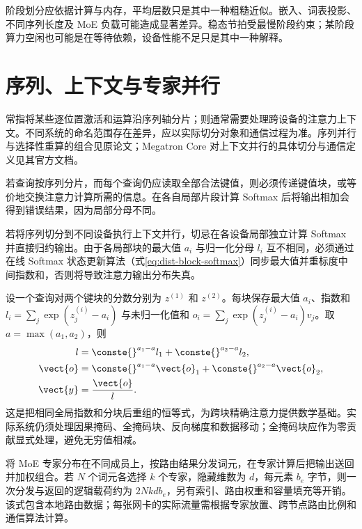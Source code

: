 \documentclass[../textbook.tex]{subfiles}
\begin{document}
阶段划分应依据计算与内存，平均层数只是其中一种粗糙近似。嵌入、词表投影、不同序列长度及 MoE 负载可能造成显著差异。稳态节拍受最慢阶段约束；某阶段算力空闲也可能是在等待依赖，设备性能不足只是其中一种解释。

\section{序列、上下文与专家并行}
\optional
{}常指将某些逐位置激活和运算沿序列轴分片；则通常需要处理跨设备的注意力上下文。不同系统的命名范围存在差异，应以实际切分对象和通信过程为准。序列并行与选择性重算的组合见原论文\autocite{korthikanti2022recomputation}；Megatron Core 对上下文并行的具体切分与通信定义见其官方文档\autocite{nvidia2026contextparallel}。

若查询按序列分片，而每个查询仍应读取全部合法键值，则必须传递键值块，或等价地交换注意力计算所需的信息。在各自局部片段计算 Softmax 后将输出相加会得到错误结果，因为局部分母不同。

\begin{warning}
若将序列切分到不同设备执行上下文并行，切忌在各设备局部独立计算 Softmax 并直接归约输出。由于各局部块的最大值 $a_i$ 与归一化分母 $l_i$ 互不相同，必须通过在线 Softmax 状态更新算法（式\eqref{eq:dist-block-softmax}）同步最大值并重标度中间指数和，否则将导致注意力输出分布失真。
\end{warning}

设一个查询对两个键块的分数分别为 $z^{(1)}$ 和 $z^{(2)}$。每块保存最大值 $a_i$、指数和 $l_i=\sum_j\exp(z_j^{(i)}-a_i)$ 与未归一化值和 $o_i=\sum_j\exp(z_j^{(i)}-a_i)v_j$。取 $a=\max(a_1,a_2)$，则
\begin{align}
 l &= \conste{}^{a_1-a}l_1+\conste{}^{a_2-a}l_2, \\
 \vect{o} &= \conste{}^{a_1-a}\vect{o}_1+\conste{}^{a_2-a}\vect{o}_2, \nonumber \\
 \vect{y} &= \frac{\vect{o}}{l}. \label{eq:dist-block-softmax}
\end{align}
这是把相同全局指数和分块后重组的恒等式，为跨块精确注意力提供数学基础。实际系统仍须处理因果掩码、全掩码块、反向梯度和数据移动；全掩码块应作为零贡献显式处理，避免无穷值相减。

将 MoE 专家分布在不同成员上，按路由结果分发词元，在专家计算后把输出送回并加权组合。若 $N$ 个词元各选择 $k$ 个专家，隐藏维数为 $d$，每元素 $b_e$ 字节，则一次分发与返回的逻辑载荷约为 $2Nkdb_e$，另有索引、路由权重和容量填充等开销。该式包含本地路由数据；每张网卡的实际流量需根据专家放置、跨节点路由比例和通信算法计算。
\end{document}
